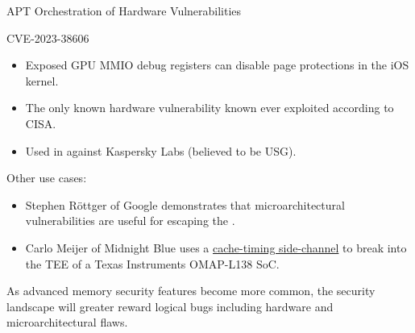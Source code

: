 \begin{frame}{APT Orchestration of Hardware Vulnerabilities}
    \begin{block}{CVE-2023-38606}
        \begin{itemize}
            \item Exposed GPU MMIO debug registers can disable page protections in the iOS kernel.
            \item The only known hardware vulnerability known ever exploited according to CISA.
            \item Used in \href{https://securelist.com/operation-triangulation-the-last-hardware-mystery/111669/}{\color{pink}{Operation Triangulation Sensation}} against Kaspersky Labs (believed to be USG).
        \end{itemize}
    \end{block}
    Other use cases:
    \begin{itemize}
        \item Stephen Röttger of Google demonstrates that microarchitectural vulnerabilities are useful for escaping the \href{https://googleprojectzero.blogspot.com/2020/02/escaping-chrome-sandbox-with-ridl.html}{\color{pink}{Chrome Sandbox}}.
        \item Carlo Meijer of Midnight Blue uses a \href{https://www.usenix.org/system/files/usenixsecurity23-meijer.pdf}{\color{pink}cache-timing side-channel} to break into the TEE of a Texas Instruments OMAP-L138 SoC. 
    \end{itemize}
    As advanced memory security features become more common, the security landscape will greater reward logical bugs including hardware and microarchitectural flaws. 
\end{frame}